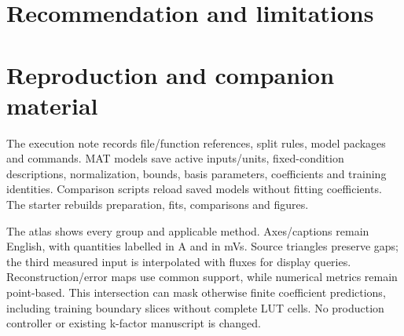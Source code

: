 \documentclass[11pt,a4paper]{article}
\begin{document}
\section{Recommendation and limitations}

\appendix
\section{Reproduction and companion material}
The execution note records file/function references, split rules, model packages and commands. MAT models save active inputs/units, fixed-condition descriptions, normalization, bounds, basis parameters, coefficients and training identities. Comparison scripts reload saved models without fitting coefficients. The starter rebuilds preparation, fits, comparisons and figures.

The atlas shows every group and applicable method. Axes/captions remain English, with quantities labelled in A and in mVs. Source triangles preserve gaps; the third measured input is interpolated with fluxes for display queries. Reconstruction/error maps use common support, while numerical metrics remain point-based. This intersection can mask otherwise finite coefficient predictions, including training boundary slices without complete LUT cells. No production controller or existing k-factor manuscript is changed.
\end{document}
